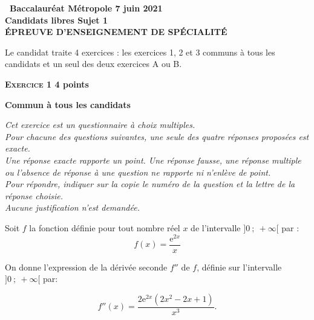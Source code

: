 \documentclass[11pt,a4paper,french]{article}
\newcommand{\e}{\text{e}}
\begin{document}
\setlength\parindent{0mm}
\pagestyle{fancy}
\thispagestyle{empty}

\begin{center}{\Large\textbf{\decofourleft~Baccalauréat Métropole 7 juin 2021~\decofourright\\[6pt] Candidats libres Sujet 1\\[6pt] ÉPREUVE D'ENSEIGNEMENT DE SPÉCIALITÉ}}
\end{center}

\vspace{0,25cm}

Le candidat traite 4 exercices : les exercices 1, 2 et 3 communs à tous les candidats et un seul des deux exercices A ou B.

\bigskip

\textbf{\textsc{Exercice 1} \hfill 4 points}

\textbf{Commun à tous les candidats}

\medskip


\emph{Cet exercice est un questionnaire à choix multiples.\\
 Pour chacune des questions suivantes, une seule des quatre réponses proposées est exacte.\\
 Une réponse exacte rapporte un point. Une réponse fausse, une réponse multiple ou l'absence de réponse à une question ne rapporte ni
n'enlève de point.\\
 Pour répondre, indiquer sur la copie le numéro de la question et la lettre de
la réponse choisie.\\ Aucune justification n'est demandée.}

\vspace{0.7cm}

Soit $f$ la fonction définie pour tout nombre réel $x$ de l'intervalle $]0~;~ +\infty[$ par :
\[ f(x) =\dfrac{\e^{2x}}{x}\]

On donne l'expression de la dérivée seconde $f''$ de $f$, définie sur l'intervalle $]0~;~ +\infty[$ par:

\[f''(x)=\dfrac {2 \e^{2x} (2x^2-2x+1)}{x^3}.\]
\end{document}
